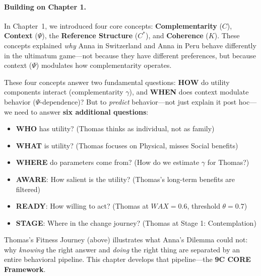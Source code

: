 \paragraph{Building on Chapter 1.}
In Chapter~1, we introduced four core concepts: \textbf{Complementarity} ($C$), \textbf{Context} ($\Psi$), the \textbf{Reference Structure} ($C^*$), and \textbf{Coherence} ($K$). These concepts explained \emph{why} Anna in Switzerland and Anna in Peru behave differently in the ultimatum game---not because they have different preferences, but because context ($\Psi$) modulates how complementarity operates.

These four concepts answer two fundamental questions: \textbf{HOW} do utility components interact (complementarity $\gamma$), and \textbf{WHEN} does context modulate behavior ($\Psi$-dependence)? But to \emph{predict} behavior---not just explain it post hoc---we need to answer \textbf{six additional questions}:

\begin{itemize}[nosep]
    \item \textbf{WHO} has utility? (Thomas thinks as individual, not as family)
    \item \textbf{WHAT} is utility? (Thomas focuses on Physical, misses Social benefits)
    \item \textbf{WHERE} do parameters come from? (How do we estimate $\gamma$ for Thomas?)
    \item \textbf{AWARE}: How salient is the utility? (Thomas's long-term benefits are filtered)
    \item \textbf{READY}: How willing to act? (Thomas at $WAX = 0.6$, threshold $\theta = 0.7$)
    \item \textbf{STAGE}: Where in the change journey? (Thomas at Stage 1: Contemplation)
\end{itemize}

\noindent Thomas's Fitness Journey (above) illustrates what Anna's Dilemma could not: why \emph{knowing} the right answer and \emph{doing} the right thing are separated by an entire behavioral pipeline. This chapter develops that pipeline---the \textbf{9C CORE Framework}.

